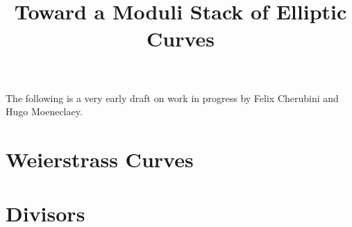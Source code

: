 \documentclass{../util/zariski}
\title{Toward a Moduli Stack of Elliptic Curves}
\begin{document}
\maketitle

The following is a very early draft on work in progress by Felix Cherubini and Hugo Moeneclaey.

\tableofcontents

\section{Weierstrass Curves}


\section{Divisors}


\printindex

\printbibliography
\end{document}
